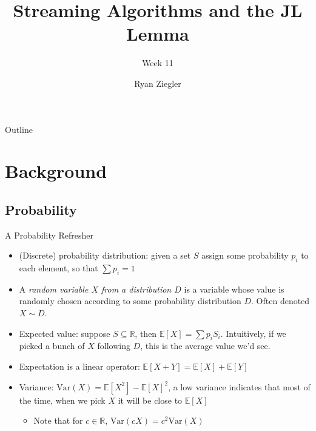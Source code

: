 \documentclass[aspectratio=169]{beamer}
\title{Streaming Algorithms and the JL Lemma}
\subtitle{Week 11}
\author{Ryan Ziegler}
\date{}
\begin{document}

\begin{frame}
\titlepage
\end{frame}

\begin{frame}{Outline}
  \tableofcontents
\end{frame}

\section{Background}

\frame{\sectionpage}

\subsection{Probability}

\frame{\subsectionpage}

\begin{frame}{A Probability Refresher}
\protect\hypertarget{a-probability-refresher}{}
\begin{itemize}
    \item (Discrete) probability distribution: given a set \(S\) assign some
probability \(p_i\) to each element, so that \(\sum p_i = 1\) \pause
    \item A \emph{random variable \(X\) from a distribution \(D\)} is a variable
whose value is randomly chosen according to some probability
distribution \(D\). Often denoted \(X \sim D\). \pause
    \item Expected value: suppose \(S \subseteq \mathbb{R}\), then
\(\mathbb{E}[X] = \sum p_i S_i\). Intuitively, if we picked a bunch of
\(X\) following \(D\), this is the average value we'd see. \pause
    \item Expectation is a linear operator:
\(\mathbb{E}[X+Y] = \mathbb{E}[X] + \mathbb{E}[Y]\) \pause
    \item Variance: \(\text{Var}(X) = \mathbb{E}[X^2] - \mathbb{E}[X]^2\), a low
variance indicates that most of the time, when we pick \(X\) it will be
close to \(\mathbb{E}[X]\) \pause
    \begin{itemize}
        \item Note that for \(c \in \mathbb{R}\),
\(\text{Var}(cX) = c^2\text{Var}(X)\)
    \end{itemize}
\end{itemize}
\end{frame}
\end{document}

